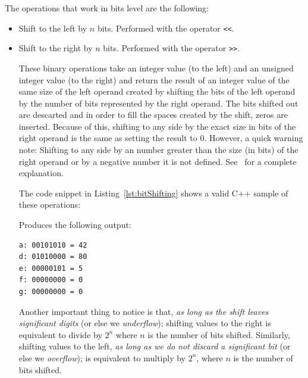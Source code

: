 The operations that work in bits level are the following:
\begin{itemize}
\item Shift to the left by $n$ bits. Performed with the operator \texttt{<<}.
\item Shift to the right by $n$ bits. Performed with the operator \texttt{>>}.

These binary operations take an integer value (to the left) and an unsigned integer value (to the right) and return the result of an integer value of the same size of the left operand created by shifting the bits of the left operand by the number of bits represented by the right operand.
The bits shifted out are descarted and in order to fill the spaces created by the shift, zeros are inserted.
Because of this, shifting to any side by the exact size in bits of the right operand is the same as setting the result to 0.
However, a quick warning note: Shifting to any side by an number greater than the size (in bits) of the right operand or by a negative number it is not defined. See~\cite{INT34Cpp} for a complete explanation.

The code snippet in Listing~\ref{lst:bitShifting} shows a valid C++ sample of these operations:

{\centering
\begin{minipage}{\linewidth}
\end{minipage}
\par
}

Produces the following output:

\begin{verbatim}
a: 00101010 = 42
d: 01010000 = 80
e: 00000101 = 5
f: 00000000 = 0
g: 00000000 = 0
\end{verbatim} 

Another important thing to notice is that, \emph{as long as the shift leaves significant digits} (or else we \emph{underflow}); shifting values to the right is equivalent to divide by $2^n$ where $n$ is the number of bits shifted.
Similarly, shifting values to the left, \emph{as long as we do not discard a significant bit} (or else we \emph{overflow}); is equivalent to multiply by $2^n$, where $n$ is the number of bits shifted.


\end{itemize}

